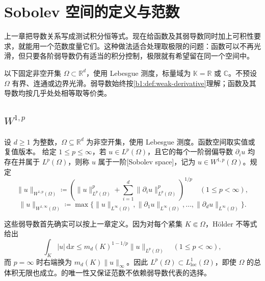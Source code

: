\section{Sobolev 空间的定义与范数}
\label{b1:sec:2101}

上一章把导数关系写成测试积分恒等式。现在给函数及其弱导数同时加上可积性要求，就能用一个范数度量它们。这种做法适合处理取极限的问题：函数可以不再光滑，但只要各阶弱导数仍有适当的积分控制，极限就有希望留在同一个空间中。

\ProseParagraphBreak

以下固定非空开集 \(\Omega\subset\mathbb R^d\)，使用 Lebesgue 测度，标量域为 \(\mathbb K=\mathbb R\) 或 \(\mathbb C\)。不预设 \(\Omega\) 有界、连通或边界光滑。弱导数始终按\cref{b1:def:weak-derivative}理解；函数及其导数均按几乎处处相等取等价类。

\subsection{\texorpdfstring{\(W^{1,p}\)}{W1,p}}
\label{b1:subsec:210101}

\begin{definition}\label{b1:def:sobolev-first-order}
设 \(d\geq1\) 为整数，\(\Omega\subseteq\mathbb R^d\) 为非空开集，使用 Lebesgue 测度。函数空间取实值或复值版本。
给定 \(1\le p\le\infty\)，若 \(u\in L^p(\Omega)\)，且它的每个一阶弱偏导数 \(\partial_i u\) 均存在并属于 \(L^p(\Omega)\)，则称 \(u\) 属于一阶[Sobolev space]，记为 \(u\in W^{1,p}(\Omega)\)。规定
\[
 \|u\|_{W^{1,p}(\Omega)}
 \coloneqq\left(\|u\|_{L^p(\Omega)}^p+
         \sum_{i=1}^d\|\partial_i u\|_{L^p(\Omega)}^p\right)^{1/p}
 \quad(1\le p<\infty),
\]
\[
 \|u\|_{W^{1,\infty}(\Omega)}
 \coloneqq\max\bigl\{\|u\|_{L^\infty(\Omega)},
                \|\partial_1u\|_{L^\infty(\Omega)},\ldots,
                \|\partial_du\|_{L^\infty(\Omega)}\bigr\}.
\]
\end{definition}

这些弱导数首先确实可以按上一章定义。因为对每个紧集 \(K\Subset\Omega\)，Hölder 不等式给出
\[
 \int_K|u|\,\mathrm dx
 \le m_d(K)^{1-1/p}\|u\|_{L^p(\Omega)}
 \quad(1\le p<\infty),
\]
而 \(p=\infty\) 时右端换为 \(m_d(K)\|u\|_\infty\)。因此 \(L^p(\Omega)\subset L^1_{\mathrm{loc}}(\Omega)\)，即使 \(\Omega\) 的总体积无限也成立。的唯一性又保证范数不依赖弱导数代表的选择。

